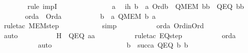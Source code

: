 \begin{isabellebody}
\ \ \ \ \ \ \isamarkupfalse%
\ {\isacharparenleft}{\kern0pt}rule\ impI{\isacharparenright}{\kern0pt}\isanewline
\ \ \ \ \isamarkupfalse%
\ {\isacharminus}{\kern0pt}\ \isanewline
\ \ \ \ \ \ \isamarkupfalse%
\ a\ \isamarkupfalse%
\ ih{\isacharcolon}{\kern0pt}\ {\isachardoublequoteopen}{\isasymforall}b\ {\isasymin}\ a{\isachardot}{\kern0pt}\ Ord{\isacharparenleft}{\kern0pt}b{\isacharparenright}{\kern0pt}\ {\isasymlongrightarrow}\ Q{\isacharparenleft}{\kern0pt}MEM{\isacharcomma}{\kern0pt}\ b{\isacharcomma}{\kern0pt}b{\isacharparenright}{\kern0pt}\ {\isasymand}\ Q{\isacharparenleft}{\kern0pt}EQ{\isacharcomma}{\kern0pt}\ b{\isacharcomma}{\kern0pt}b{\isacharparenright}{\kern0pt}{\isachardoublequoteclose}\ \isanewline
\ \ \ \ \ \ \ orda\ {\isacharcolon}{\kern0pt}\ {\isachardoublequoteopen}Ord{\isacharparenleft}{\kern0pt}a{\isacharparenright}{\kern0pt}{\isachardoublequoteclose}\ \isanewline
\ \ \ \ \ \ \isamarkupfalse%
\ \isamarkupfalse%
\ {\isachardoublequoteopen}{\isasymforall}b\ {\isasymin}\ a{\isachardot}{\kern0pt}\ Q{\isacharparenleft}{\kern0pt}MEM{\isacharcomma}{\kern0pt}\ b{\isacharcomma}{\kern0pt}\ a{\isacharparenright}{\kern0pt}{\isachardoublequoteclose}\ \isanewline
\ \ \ \ \ \ \ \ \isamarkupfalse%
\ {\isacharparenleft}{\kern0pt}rule{\isacharunderscore}{\kern0pt}tac\ MEM{\isacharunderscore}{\kern0pt}step{\isacharparenright}{\kern0pt}\ \isanewline
\ \ \ \ \ \ \ \ \ \isamarkupfalse%
\ simp\ \isanewline
\ \ \ \ \ \ \ \ \isamarkupfalse%
\ orda\ Ord{\isacharunderscore}{\kern0pt}in{\isacharunderscore}{\kern0pt}Ord\ \isanewline
\ \ \ \ \ \ \ \ \isamarkupfalse%
\ auto\ \isanewline
\ \ \ \ \ \ \isamarkupfalse%
\ \isamarkupfalse%
\ H\ {\isacharcolon}{\kern0pt}\ {\isachardoublequoteopen}Q{\isacharparenleft}{\kern0pt}EQ{\isacharcomma}{\kern0pt}\ a{\isacharcomma}{\kern0pt}a{\isacharparenright}{\kern0pt}{\isachardoublequoteclose}\ \isanewline
\ \ \ \ \ \ \ \ \isamarkupfalse%
\ {\isacharparenleft}{\kern0pt}rule{\isacharunderscore}{\kern0pt}tac\ EQ{\isacharunderscore}{\kern0pt}step{\isacharparenright}{\kern0pt}\ \isanewline
\ \ \ \ \ \ \ \ \isamarkupfalse%
\ orda\ \isanewline
\ \ \ \ \ \ \ \ \ \isamarkupfalse%
\ auto\ \isanewline
\ \ \ \ \ \ \ \ \isamarkupfalse%
\ \isanewline
\ \ \ \ \ \ \isamarkupfalse%
\ \isamarkupfalse%
\ {\isachardoublequoteopen}{\isasymforall}b\ {\isasymin}\ succ{\isacharparenleft}{\kern0pt}a{\isacharparenright}{\kern0pt}{\isachardot}{\kern0pt}\ Q{\isacharparenleft}{\kern0pt}EQ{\isacharcomma}{\kern0pt}\ b{\isacharcomma}{\kern0pt}\ b{\isacharparenright}{\kern0pt}{\isachardoublequoteclose}\ \isanewline

\end{isabellebody}
